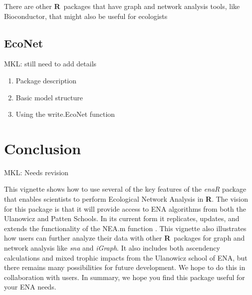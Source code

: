 \documentclass[article]{jss}
\newcommand{\R}{\textbf{R}}
\begin{document}
There are other \R\ packages that have graph and network analysis tools,
like Bioconductor, that might also be useful for ecologists

\subsection{EcoNet}

{ MKL: still need to add details}
\begin{enumerate}
\item Package description
\item Basic model structure
\item Using the write.EcoNet function
\end{enumerate}


\section{Conclusion}

{ MKL: Needs revision}

This vignette shows how to use several of the key features of the
\textit{enaR} package that enables scientists to perform Ecological
Network Analysis in \R.  The vision for this package is that it will
provide access to ENA algorithms from both the Ulanowicz and Patten
Schools.  In its current form it replicates, updates, and extends the
functionality of the NEA.m function \citep{fath06}.  This vignette
also illustrates how users can further analyze their data with other
\R\ packages for graph and network analysis like \textit{sna} and
\textit{iGraph}.  It also includes both ascendency calculations and
mixed trophic impacts from the Ulanowicz school of ENA, but there
remains many possibilities for future development.  We hope to do this
in collaboration with users. In summary, we hope you find this package
useful for your ENA needs.



\end{document}
